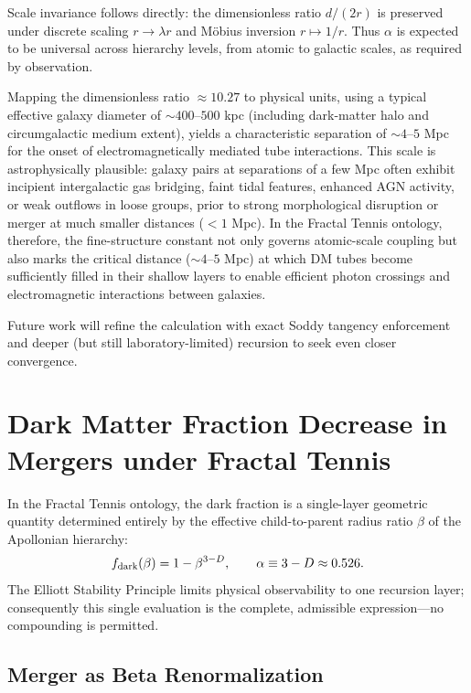 \documentclass[11pt,a4paper]{article}
\begin{document}
Scale invariance follows directly: the dimensionless ratio $d/(2r)$ is preserved under discrete scaling $r \to \lambda r$ and M\"obius inversion $r \mapsto 1/r$. Thus $\alpha$ is expected to be universal across hierarchy levels, from atomic to galactic scales, as required by observation.

Mapping the dimensionless ratio $\approx 10.27$ to physical units, using a typical effective galaxy diameter of $\sim 400$--$500$ kpc (including dark-matter halo and circumgalactic medium extent), yields a characteristic separation of $\sim 4$--$5$ Mpc for the onset of electromagnetically mediated tube interactions. This scale is astrophysically plausible: galaxy pairs at separations of a few Mpc often exhibit incipient intergalactic gas bridging, faint tidal features, enhanced AGN activity, or weak outflows in loose groups, prior to strong morphological disruption or merger at much smaller distances ($<1$ Mpc). In the Fractal Tennis ontology, therefore, the fine-structure constant not only governs atomic-scale coupling but also marks the critical distance ($\sim 4$--$5$ Mpc) at which DM tubes become sufficiently filled in their shallow layers to enable efficient photon crossings and electromagnetic interactions between galaxies.

Future work will refine the calculation with exact Soddy tangency enforcement and deeper (but still laboratory-limited) recursion to seek even closer convergence.


\section{Dark Matter Fraction Decrease in Mergers under Fractal Tennis}

In the Fractal Tennis ontology, the dark fraction is a single-layer geometric
quantity determined entirely by the effective child-to-parent radius ratio
$\beta$ of the Apollonian hierarchy:
\[
f_{\rm dark}(\beta) = 1 - \beta^{3-D}, \qquad \alpha \equiv 3-D \approx 0.526.
\]
The Elliott Stability Principle limits physical observability to one recursion
layer; consequently this single evaluation is the complete, admissible
expression---no compounding is permitted.

\subsection{Merger as Beta Renormalization}
\end{document}
